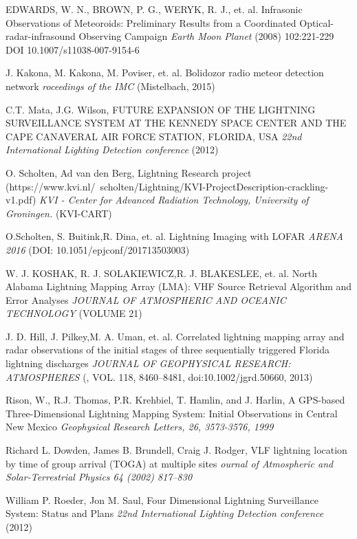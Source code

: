 \documentclass[twoside]{ctuthesis}
\theoremstyle{plain}
\theoremstyle{definition}
\theoremstyle{note}
\begin{document}
\begin{thebibliography}{99}
EDWARDS, W. N., BROWN, P. G., WERYK, R. J., et. al.
Infrasonic Observations of Meteoroids: Preliminary Results from a Coordinated Optical-radar-infrasound Observing Campaign
\emph{Earth Moon Planet} (2008) 102:221-229
DOI 10.1007/s11038-007-9154-6

J. Kakona, M. Kakona, M. Poviser, et. al.
Bolidozor radio meteor detection network
\emph{roceedings of the IMC} (Mistelbach, 2015)


C.T. Mata, J.G. Wilson,
FUTURE EXPANSION OF THE LIGHTNING SURVEILLANCE SYSTEM AT THE KENNEDY SPACE CENTER AND THE CAPE CANAVERAL AIR FORCE STATION, FLORIDA, USA  
\emph{22nd International Lighting Detection conference} (2012) 

O. Scholten, Ad van den Berg,
Lightning Research project (https://www.kvi.nl/~scholten/Lightning/KVI-ProjectDescription-crackling-v1.pdf)
\emph{KVI - Center for Advanced Radiation Technology, University of Groningen.} (KVI-CART) 

O.Scholten, S. Buitink,R. Dina, et. al.
Lightning Imaging with LOFAR
\emph{ARENA 2016} (DOI: 10.1051/epjconf/201713503003) 

W. J. KOSHAK, R. J. SOLAKIEWICZ,R. J. BLAKESLEE, et. al.
North Alabama Lightning Mapping Array (LMA): VHF Source Retrieval Algorithm
and Error Analyses
\emph{JOURNAL OF ATMOSPHERIC AND OCEANIC TECHNOLOGY} (VOLUME 21) 

J. D. Hill, J. Pilkey,M. A. Uman, et. al.
Correlated lightning mapping array and radar observations of the initial stages of three sequentially triggered Florida lightning discharges
\emph{JOURNAL OF GEOPHYSICAL RESEARCH: ATMOSPHERES} (, VOL. 118, 8460–8481, doi:10.1002/jgrd.50660, 2013) 

Rison, W., R.J. Thomas, P.R. Krehbiel, T. Hamlin, and J. Harlin, A GPS-based Three-Dimensional Lightning Mapping System: Initial Observations in Central New Mexico
\emph{Geophysical Research Letters, 26, 3573-3576, 1999}

Richard L. Dowden,  James B. Brundell, Craig J. Rodger, 
VLF lightning location by time of group arrival (TOGA) at multiple sites
\emph{ournal of Atmospheric and Solar-Terrestrial Physics 64 (2002) 817–830}


William P. Roeder, Jon M. Saul,
Four Dimensional Lightning Surveillance System:  Status and Plans  
\emph{22nd International Lighting Detection conference} (2012)


\end{thebibliography}
\end{document}
